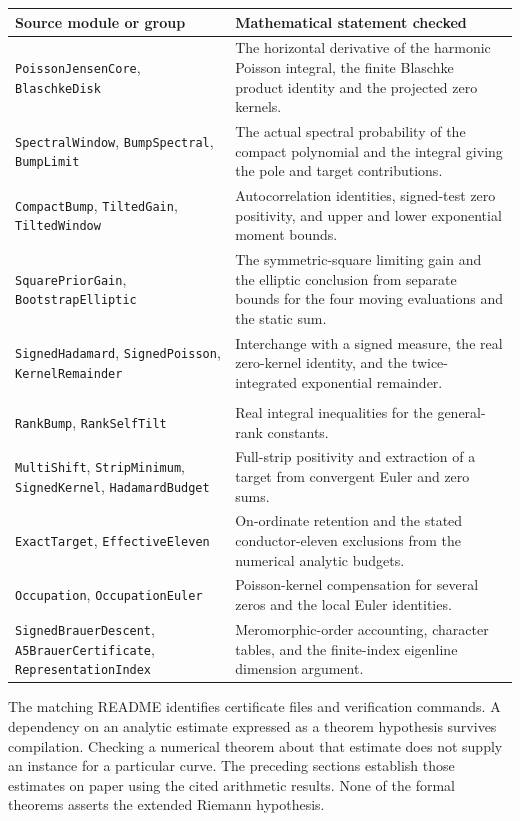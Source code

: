 \documentclass[11pt]{article}
\begin{document}
\begin{center}\small
\begin{tabular}{@{}p{.35\linewidth}p{.58\linewidth}@{}}\toprule
Source module or group & Mathematical statement checked\\\midrule
\texttt{PoissonJensenCore}, \texttt{BlaschkeDisk} & The horizontal derivative of the harmonic Poisson integral, the finite Blaschke product identity and the projected zero kernels.\\
\texttt{SpectralWindow}, \texttt{BumpSpectral}, \texttt{BumpLimit} & The actual spectral probability of the compact polynomial and the integral giving the pole and target contributions.\\
\texttt{CompactBump}, \texttt{TiltedGain}, \texttt{TiltedWindow} & Autocorrelation identities, signed-test zero positivity, and upper and lower exponential moment bounds.\\
\texttt{SquarePriorGain}, \texttt{BootstrapElliptic} & The symmetric-square limiting gain and the elliptic conclusion from separate bounds for the four moving evaluations and the static sum.\\
\texttt{SignedHadamard}, \texttt{SignedPoisson}, \texttt{KernelRemainder} & Interchange with a signed measure, the real zero-kernel identity, and the twice-integrated exponential remainder.\\\\
\texttt{RankBump}, \texttt{RankSelfTilt} & Real integral inequalities for the general-rank constants.\\
\texttt{MultiShift}, \texttt{StripMinimum}, \texttt{SignedKernel}, \texttt{HadamardBudget} & Full-strip positivity and extraction of a target from convergent Euler and zero sums.\\
\texttt{ExactTarget}, \texttt{EffectiveEleven} & On-ordinate retention and the stated conductor-eleven exclusions from the numerical analytic budgets.\\
\texttt{Occupation}, \texttt{OccupationEuler} & Poisson-kernel compensation for several zeros and the local Euler identities.\\
\texttt{SignedBrauerDescent}, \texttt{A5BrauerCertificate}, \texttt{RepresentationIndex} & Meromorphic-order accounting, character tables, and the finite-index eigenline dimension argument.\\
\bottomrule\end{tabular}\end{center}
The matching README identifies certificate files and verification commands. A dependency on an analytic estimate expressed as a theorem hypothesis survives compilation. Checking a numerical theorem about that estimate does not supply an instance for a particular curve. The preceding sections establish those estimates on paper using the cited arithmetic results. None of the formal theorems asserts the extended Riemann hypothesis.
\end{document}
